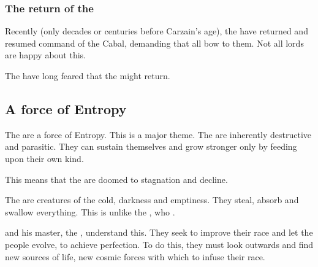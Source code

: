 \subsubsection{The return of the \banelords}
\label{Return of the \banelords}
\label{return of the \banelords}
Recently (only decades or centuries before Carzain's age), the \banelords{} have returned and resumed command of the Cabal, demanding that all \resphain{} bow to them. Not all \resphan{} lords are happy about this. 

The \dragons{} have long feared that the \banelords{} might return. 










\subsection{A force of Entropy}
\label{Bane Entropy}
\label{Bane parasitism}
The \banes{} are a force of Entropy. This is a major theme. The \banes{} are inherently destructive and parasitic. They can sustain themselves and grow stronger only by feeding upon their own kind. 

This means that the \banes{} are doomed to stagnation and decline. 

The \banes{} are creatures of the cold, darkness and emptiness. They steal, absorb and swallow everything. This is unlike the \dragons, who . 

\hs{\Daggerrain} and his master, the \hs{\Voidbringer}, understand this. They seek to improve their race and let the \bane{} people evolve, to achieve perfection. To do this, they must look outwards and find new sources of life, new cosmic forces with which to infuse their race. 


